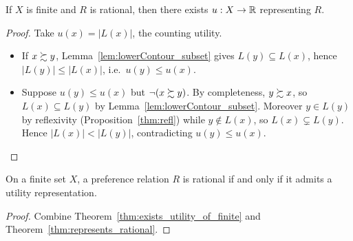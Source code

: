 \begin{theorem}
\label{thm:exists_utility_of_finite}
\leanok
{}
If $X$ is finite and $R$ is rational, then there exists $u : X \to \mathbb{R}$ representing $R$.
\end{theorem}
\begin{proof}
\leanok
Take $u(x) = |L(x)|$, the counting utility.
\begin{itemize}
  \item[$(\Rightarrow)$] If $x \succsim y$, Lemma~\ref{lem:lowerContour_subset} gives
        $L(y) \subseteq L(x)$, hence $|L(y)| \le |L(x)|$, i.e.\ $u(y) \le u(x)$.
  \item[$(\Leftarrow)$] Suppose $u(y) \le u(x)$ but $\neg(x \succsim y)$. By completeness,
        $y \succsim x$, so $L(x) \subseteq L(y)$ by Lemma~\ref{lem:lowerContour_subset}.
        Moreover $y \in L(y)$ by reflexivity (Proposition~\ref{thm:refl}) while
        $y \notin L(x)$, so $L(x) \subsetneq L(y)$. Hence $|L(x)| < |L(y)|$,
        contradicting $u(y) \le u(x)$.
\end{itemize}
\end{proof}

\begin{corollary}
\label{thm:rational_iff_utility}
\leanok
{}
On a finite set $X$, a preference relation $R$ is rational if and only if it admits a
utility representation.
\end{corollary}
\begin{proof}
\leanok
Combine Theorem~\ref{thm:exists_utility_of_finite} and Theorem~\ref{thm:represents_rational}.
\end{proof}


